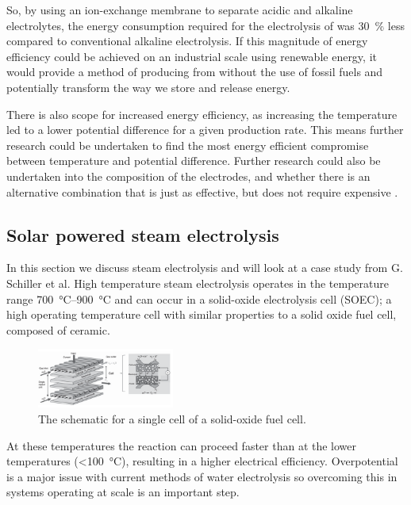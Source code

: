 So, by using an ion-exchange membrane to separate acidic and alkaline electrolytes, the energy consumption required for the electrolysis of  was \SI{30}{\percent} less compared to conventional alkaline electrolysis\cite{Lei2019}.
If this magnitude of energy efficiency could be achieved on an industrial scale using renewable energy, it would provide a method of producing  from  without the use of fossil fuels and potentially transform the way we store and release energy.

There is also scope for increased energy efficiency, as increasing the temperature led to a lower potential difference for a given  production rate.
This means further research could be undertaken to find the most energy efficient compromise between temperature and potential difference.
Further research could also be undertaken into the composition of the electrodes, and whether there is an alternative combination that is just as effective, but does not require expensive .

\subsection{Solar powered steam electrolysis}%
\label{sub:solar_powered_steam_electrolysis}
In this section we discuss steam electrolysis and will look at a case study from G. Schiller et al.\cite{Schiller2019}
High temperature steam electrolysis operates in the temperature range \SIrange{700}{900}{\celsius}\cite{Schiller2019} and can occur in a solid-oxide electrolysis cell (SOEC); a high operating temperature cell with similar properties to a solid oxide fuel cell, composed of ceramic\cite{Laurencin}.
\begin{figure}[H]
	\centering
	\includegraphics[width=0.4\textwidth]{cf89a71a-2c53-11eb-895f-8c8590753a48.png}
	\caption{The schematic for a single cell of a solid-oxide fuel cell.}
	\label{fig:SE_cell}
\end{figure}
At these temperatures the reaction can proceed faster than at the lower temperatures (\SI{<100}{\celsius}), resulting in a higher electrical efficiency\cite{Schiller2019}.
Overpotential is a major issue with current methods of water electrolysis so overcoming this in systems operating at scale is an important step.

